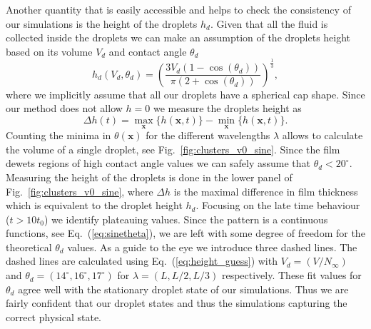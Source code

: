 \documentclass[twocolumn,amsmath,amssymb,showpacs,pre,nofootinbib,superscriptaddress]{revtex4-1} %
\begin{document}
Another quantity that is easily accessible and helps to check the consistency of our simulations is the height of the droplets $h_d$.
Given that all the fluid is collected inside the droplets we can make an assumption of the droplets height based on its volume $V_d$  and contact angle $\theta_d$ 
\begin{equation}\label{eq:height_guess}
    h_d(V_d, \theta_d) = \left(\frac{3V_d(1-\cos(\theta_d))}{\pi(2+\cos(\theta_d))}\right)^{\frac{1}{3}},
\end{equation}
where we implicitly assume that all our droplets have a spherical cap shape.
Since our method does not allow $h=0$ we measure the droplets height as~\cite{PhysRevE.100.033313}
\begin{equation}\label{eq:delta_h_measure}
    \Delta h(t) = \max_{\mathbf{x}}\{h(\mathbf{x},t)\} - \min_{\mathbf{x}}\{h(\mathbf{x},t)\}.
\end{equation}
Counting the minima in $\theta(\mathbf{x})$ for the different wavelengths $\lambda$ allows to calculate the volume of a single droplet, see Fig.~\ref{fig:clusters_v0_sine}.
Since the film dewets regions of high contact angle values we can safely assume that $\theta_d < 20^{\circ}$.
Measuring the height of the droplets is done in the lower panel of Fig.~\ref{fig:clusters_v0_sine}, where $\Delta h$ is the maximal difference in film thickness which is equivalent to the droplet height $h_d$.
Focusing on the late time behaviour ($t > 10t_0$) we identify plateauing values. 
Since the pattern is a continuous functions, see Eq.~(\ref{eq:sinetheta}), we are left with some degree of freedom for the theoretical $\theta_d$ values. 
As a guide to the eye we introduce three dashed lines.
The dashed lines are calculated using Eq.~(\ref{eq:height_guess}) with $V_d = (V/N_{\infty})$ and $\theta_d = (14^{\circ}, 16^{\circ}, 17^{\circ})$ for $\lambda=(L,L/2,L/3)$ respectively.
These fit values for $\theta_d$ agree well with the stationary droplet state of our simulations.
Thus we are fairly confident that our droplet states and thus the simulations capturing the correct physical state.
\end{document}
